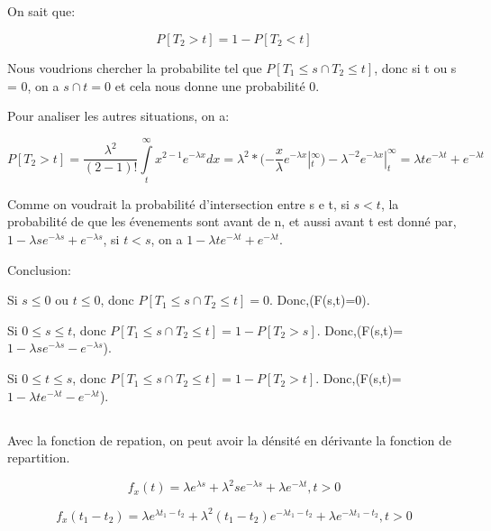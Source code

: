 \documentclass[a4paper]{article}
\begin{document}
\subsection{}

On sait que:

\begin{equation}
P[T_2 > t] =1 - P[T_2 < t]
\end{equation}

Nous voudrions  chercher la probabilite tel  que $P[T_1\leq s  \cap T_2\leq t]$,
donc si t ou s = 0, on a $s \cap t = 0$ et cela nous donne une probabilité 0.

Pour analiser les autres situations, on a:

\begin{equation*}
P[T_2 > t] = \frac{\lambda ^2}{(2 - 1)!}\int\limits_t^\infty{x^{2-1}}e^{-\lambda x}dx= \lambda ^2 *(-\frac{x}{\lambda} e^{-\lambda x} |_t^\infty)- \lambda^{-2} e^{-\lambda x}|_t^\infty = \lambda te^{-\lambda t} + e^{-\lambda t}
\end{equation*}

Comme  on voudrait  la probabilité  d'intersection  entre s  e t,  si $s<t$,  la
probabilité de que  les évenements sont avant  de n, et aussi avant  t est donné
par, $1 - \lambda se^{-\lambda s} + e^{-\lambda s}$, si $t<s$, on a 
$1 - \lambda te^{-\lambda t} + e^{-\lambda t}$.



Conclusion: 

Si $s \leq 0$ ou $t \leq 0$, donc $P[{T_1 \leq s} \cap {T_2 \leq t}]=0$. Donc,(F(s,t)=0).

Si $0 \leq s \leq t $, donc $P[{T_1 \leq s} \cap {T_2 \leq t}]=1-P[T_2 > s]$. Donc,(F(s,t)=$1 - \lambda se^{-\lambda s} - e^{-\lambda s}$).

Si $0 \leq t \leq s $, donc $P[{T_1 \leq s} \cap {T_2 \leq t}]=1-P[T_2 > t]$. Donc,(F(s,t)=$1 - \lambda te^{-\lambda t} - e^{-\lambda t}$).


\subsection{}
Avec la fonction de repation, on  peut avoir la dénsité en dérivante la fonction
de repartition. 

\begin{equation}
f_x(t) = \lambda e^{\lambda s}+\lambda ^2se^{-\lambda s}+\lambda e^{-\lambda t} , t>0
\end{equation}

\begin{equation}
f_x(t_1-t_2) = \lambda e^{\lambda t_1-t_2}+\lambda ^2(t_1-t_2)e^{-\lambda t_1-t_2}+\lambda e^{-\lambda t_1-t_2} , t>0
\end{equation}



\end{document}
